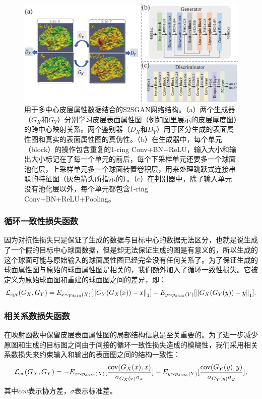 \begin{figure}[t]
	\centering
	\includegraphics[width=\linewidth]{figure/s2sgan_architecture.eps}
	\caption{用于多中心皮层属性数据结合的S2SGAN网络结构。（a）两个生成器（$G_X$和$G_Y$）分别学习皮层表面属性图（例如图里展示的皮层厚度图）的跨中心映射关系。两个鉴别器（$D_X$和$D_Y$）用于区分生成的表面属性图和真实的表面属性图的真伪性。（b）在生成器中，每个单元（block）的操作包含重复的1-ring Conv+BN+ReLU，输入大小和输出大小标记在了每一个单元的前后，每个下采样单元还要多一个球面池化层，上采样单元多一个球面转置卷积层，用来处理跳跃式连接串联的特征图（灰色箭头所指示的）。（c）在判别器中，除了输入单元没有池化层以外，每个单元都包含1-ring Conv+BN+ReLU+Pooling。}\label{fig:s2sgan_architecture} 
\end{figure} 
	
\subsubsection{循环一致性损失函数}
因为对抗性损失只是保证了生成的数据与目标中心的数据无法区分，也就是说生成了一个假的目标中心球面数据，但是却无法保证生成的图是有意义的，所以生成的这个球面可能与原始输入的球面属性图已经完全没有任何关系了。为了保证生成的球面属性图与原始的球面属性图是相关的，我们额外加入了循环一致性损失\cite{zhu2017unpaired}。它被定义为原始球面图和重建的球面图之间的差异，即：
\begin{equation}
	   	{{\cal L}_{cyc}}({G_X},{G_Y}) = {E_{x\sim{p_{data}}(X)}}[{\left\| {{G_Y}({G_X}(x)) - x} \right\|_1}] + {E_{y\sim{p_{data}}(Y)}}[{\left\| {{G_X}({G_Y}(y)) - y} \right\|_1}]. 
\end{equation}

\subsubsection{相关系数损失函数}
在映射函数中保留皮层表面属性图的局部结构信息是至关重要的。为了进一步减少原图和生成的目标图之间由于间接的循环一致性损失造成的模糊性，我们采用相关系数损失来约束输入和输出的表面图之间的结构一致性：
\begin{equation}
	{{\cal L}_{cc}}({G_X},{G_Y}) =  - {E_{x\sim{p_{data}}(X)}}[\frac{{{\mathop{\rm cov}} ({G_X}(x),x)}}{{{\sigma _{{G_X}(x)}}{\sigma _x}}}] - {E_{y\sim{p_{data}}(Y)}}[\frac{{{\mathop{\rm cov}} ({G_Y}(y),y)}}{{{\sigma _{{G_Y}(y)}}{\sigma _y}}}],
\end{equation}
其中$cov$表示协方差，$\sigma$表示标准差。
	
